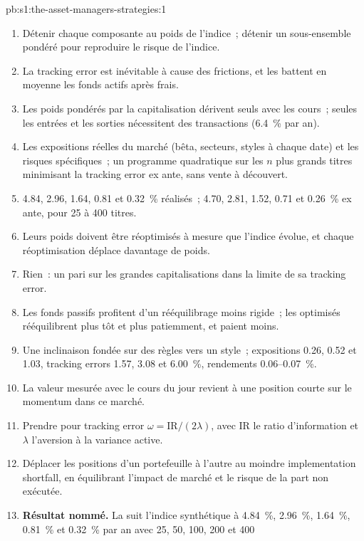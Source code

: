 \begin{solution}{pb:s1:the-asset-managers-strategies:1}
\begin{enumerate}
\item Détenir chaque composante au poids de l'indice~; détenir un sous-ensemble pondéré pour reproduire le risque de l'indice.
\item La tracking error est inévitable à cause des frictions, et les  battent en moyenne les fonds actifs après frais.
\item Les poids pondérés par la capitalisation dérivent seuls avec les cours~; seules les entrées et les sorties nécessitent des transactions (6.4~\% par an).
\item Les expositions réelles du marché (bêta, secteurs, styles à chaque date) et les risques spécifiques~; un programme quadratique sur les $n$ plus grands titres minimisant la
tracking error ex ante, sans vente à découvert.
\item 4.84, 2.96, 1.64, 0.81 et 0.32~\% réalisés~; 4.70, 2.81, 1.52, 0.71 et 0.26~\% ex ante, pour 25 à 400 titres.
\item Leurs poids doivent être réoptimisés à mesure que l'indice évolue, et chaque réoptimisation déplace davantage de poids.
\item Rien~: un pari sur les grandes capitalisations dans la limite de sa tracking error.
\item Les fonds passifs profitent d'un rééquilibrage moins rigide~; les  optimisés rééquilibrent plus tôt et plus patiemment, et paient moins.
\item Une inclinaison fondée sur des règles vers un style~; expositions 0.26, 0.52 et 1.03, tracking errors 1.57, 3.08 et 6.00~\%, rendements 0.06--0.07~\%.
\item La valeur mesurée avec le cours du jour revient à une position courte sur le momentum dans ce marché.
\item Prendre pour tracking error $\omega = \text{IR}/(2\lambda)$, avec IR le ratio d'information et $\lambda$ l'aversion à la variance active.
\item Déplacer les positions d'un portefeuille à l'autre au moindre implementation shortfall, en équilibrant l'impact de marché et le risque de la part non exécutée.
\item \textbf{Résultat nommé.} La  suit l'indice synthétique à 4.84~\%, 2.96~\%, 1.64~\%, 0.81~\% et 0.32~\% par an avec 25, 50, 100, 200 et 400

\end{enumerate}
\end{solution}
